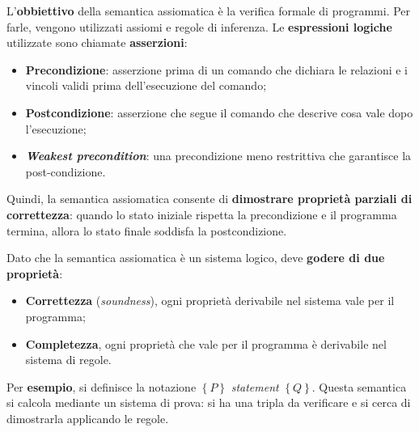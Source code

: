 \documentclass[a4paper]{article}
\begin{document}
	\noindent
	L'\textbf{obbiettivo} della semantica assiomatica è la verifica formale di programmi. Per farle, vengono utilizzati assiomi e regole di inferenza. Le \textbf{espressioni logiche} utilizzate sono chiamate \textbf{asserzioni}:
	\begin{itemize}
		\item \textbf{Precondizione}: asserzione prima di un comando che dichiara le relazioni e i vincoli validi prima dell'esecuzione del comando;
		
		\item \textbf{Postcondizione}: asserzione che segue il comando che descrive cosa vale dopo l'esecuzione;
		
		\item \textbf{\emph{Weakest precondition}}: una precondizione meno restrittiva che garantisce la post-condizione.
	\end{itemize}
	Quindi, la semantica assiomatica consente di \textbf{dimostrare proprietà parziali di correttezza}: quando lo stato iniziale rispetta la precondizione e il programma termina, allora lo stato finale soddisfa la postcondizione.\newline
	
	\noindent
	Dato che la semantica assiomatica è un sistema logico, deve \textbf{godere di due proprietà}:
	\begin{itemize}
		\item \textbf{Correttezza} (\emph{soundness}), ogni proprietà derivabile nel sistema vale per il programma;
		
		\item \textbf{Completezza}, ogni proprietà che vale per il programma è derivabile nel sistema di regole.
	\end{itemize}\newpage

	\noindent
	Per \textcolor{Green4}{\textbf{esempio}}, si definisce la notazione $\left\{P\right\}$ \emph{statement} $\left\{Q\right\}$. Questa semantica si calcola mediante un sistema di prova: si ha una tripla da verificare e si cerca di dimostrarla applicando le regole.\newline
	
\end{document}

